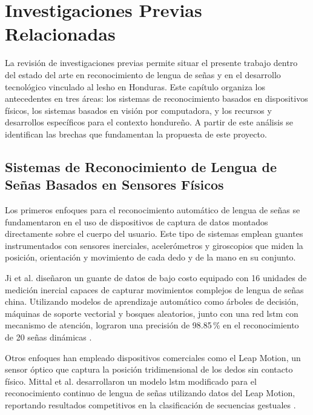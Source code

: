\chapter{Investigaciones Previas Relacionadas}
\label{chap:investigaciones-previas}

\insertminitoc
\parindent0pt

La revisión de investigaciones previas permite situar el presente trabajo dentro del estado
del arte en reconocimiento de lengua de señas y en el desarrollo tecnológico vinculado al
\acrshort{lesho} en Honduras. Este capítulo organiza los antecedentes en tres áreas: los sistemas de
reconocimiento basados en dispositivos físicos, los sistemas basados en visión por
computadora, y los recursos y desarrollos específicos para el contexto hondureño. A partir
de este análisis se identifican las brechas que fundamentan la propuesta de este proyecto.

\section{Sistemas de Reconocimiento de Lengua de Señas Basados en Sensores Físicos}

Los primeros enfoques para el reconocimiento automático de lengua de señas se
fundamentaron en el uso de dispositivos de captura de datos montados directamente sobre
el cuerpo del usuario. Este tipo de sistemas emplean guantes instrumentados con sensores
inerciales, acelerómetros y giroscopios que miden la posición, orientación y movimiento de
cada dedo y de la mano en su conjunto.

Ji et al. diseñaron un guante de datos de bajo costo equipado con 16 unidades de medición
inercial capaces de capturar movimientos complejos de lengua de señas china. Utilizando
modelos de aprendizaje automático como árboles de decisión, máquinas de soporte
vectorial y bosques aleatorios, junto con una red \acrshort{lstm} con mecanismo de atención,
lograron una precisión de 98.85\,\% en el reconocimiento de 20 señas dinámicas \cite{ji_dataglove_2023}.

Otros enfoques han empleado dispositivos comerciales como el Leap Motion, un sensor
óptico que captura la posición tridimensional de los dedos sin contacto físico. Mittal et al.
desarrollaron un modelo \acrshort{lstm} modificado para el reconocimiento continuo de lengua de
señas utilizando datos del Leap Motion, reportando resultados competitivos en la
clasificación de secuencias gestuales \cite{mittal_lstm_2019}.

